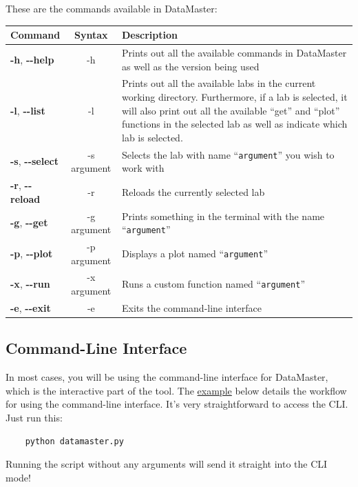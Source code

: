 \documentclass[12pt]{article}
\begin{document}
{These are the commands available in DataMaster:
\begin{framed}
  \centering
  {
  \setlength{\tabcolsep}{14pt}
  \renewcommand{\arraystretch}{2.5}
    \begin{tabular}{l | c | m{}}
      Command & Syntax & Description\\\hline
      \textbf{-h}, \textbf{{-}-help} & -h & Prints out all the available commands in DataMaster as well as the version being used \\
      \textbf{-l}, \textbf{{-}-list} & -l & Prints out all the available labs in the current working directory. Furthermore, if a lab is selected, it will also print out all the available ``get'' and ``plot'' functions in the selected lab as well as indicate which lab is selected.\\
      \textbf{-s}, \textbf{{-}-select} & -s argument & Selects the lab with name ``\texttt{argument}'' you wish to work with \\
      \textbf{-r}, \textbf{{-}-reload} & -r & Reloads the currently selected lab \\
      \textbf{-g}, \textbf{{-}-get} & -g argument & Prints something in the terminal with the name ``\texttt{argument}'' \\
      \textbf{-p}, \textbf{{-}-plot} & -p argument & Displays a plot named ``\texttt{argument}''\\
      \textbf{-x}, \textbf{{-}-run} & -x argument & Runs a custom function named ``\texttt{argument}'' \\
      \textbf{-e}, \textbf{{-}-exit} & -e & Exits the command-line interface \\
    \end{tabular}
  }
\end{framed}

\subsection*{Command-Line Interface}

In most cases, you will be using the command-line interface for DataMaster, which is the interactive part of the tool. The \hyperref[sec:example]{example} below details the workflow for using the command-line interface. It's very straightforward to access the CLI. Just run this:
\begin{framed}
  \begin{lstlisting}
    python datamaster.py
  \end{lstlisting}
\end{framed}
Running the script without any arguments will send it straight into the CLI mode!

}
\end{document}
